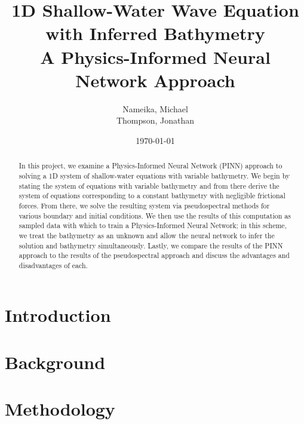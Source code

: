 \documentclass[letterpaper,12pt]{article}
\begin{document}
    \title{\vspace{1.0in}%
        1D Shallow-Water Wave Equation with Inferred Bathymetry\\
        \large A Physics-Informed Neural Network Approach
    }
    \author{%
        Nameika, Michael \\
        Thompson, Jonathan
    }
    \date{\today}

    \maketitle

    \vspace*{1.0in}

    \begin{abstract}
        In this project, we examine a Physics-Informed Neural Network (PINN) approach to solving a 1D system of 
        shallow-water equations with variable bathymetry. We begin by stating the system of equations with variable
        bathymetry and from there derive the system of equations corresponding to a constant bathymetry with negligible
        frictional forces. From there, we solve the resulting system via pseudospectral methods for various boundary
        and initial conditions. We then use the results of this computation as sampled data with which to train a 
        Physics-Informed Neural Network; in this scheme, we treat the bathymetry as an unknown and allow the 
        neural network to infer the solution and bathymetry simultaneously. Lastly, we compare the results of the PINN
        approach to the results of the pseudospectral approach and discuss the advantages and disadvantages of each.
    \end{abstract}

    \pagebreak

    \section{Introduction}\label{sec:introduction}
        

    \section{Background}\label{sec:background}
        

    \section{Methodology}\label{sec:proposed-methodology}
        
\end{document}
